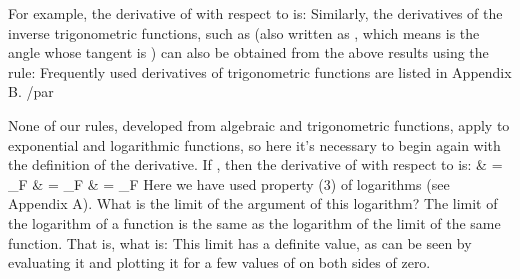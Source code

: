{{For example, the derivative of \m{\tan\theta}  with respect to \m{\theta}  is:
%
%
Similarly, the derivatives of the inverse trigonometric functions, such as
 (also written as , which means \m{\theta} is
the angle whose tangent is ) can also be obtained from the above results
using the rule:
%
%
Frequently used derivatives of trigonometric functions are listed in
Appendix B.} /par
%
\par{None of our rules, developed from algebraic and trigonometric functions,
apply to exponential and logarithmic functions, so here it's necessary to
begin again with the definition of the derivative.
If , then the derivative of  with respect to  is:
%
           {               & = \lim_{\Delta F}}
           {               & = \lim_{\Delta F}}
           {               & = \lim_{\Delta F}}
%
Here we have used property (3) of logarithms (see Appendix A).
What is the limit of the argument of this logarithm?
%
%
{The limit of the logarithm of a function is the same as the logarithm of
 the limit of the same function.
}
%
That is, what is:
%
%
This limit has a definite value, as can be seen by evaluating it and
plotting it for a few values of  on both sides of zero.
}}
